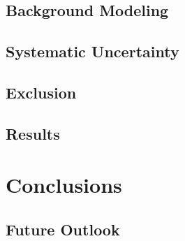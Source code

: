 \documentclass[oneside, letterpaper, 12pt, oldfontcommands]{memoir}
\begin{document}
\section{Background Modeling}
\section{Systematic Uncertainty}
\section{Exclusion}
\section{Results}


\chapter{Conclusions}
\section{Future Outlook}
\end{document}
